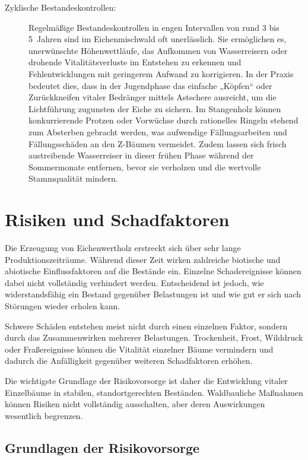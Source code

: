 \documentclass[twocolumn, bibliography=totoc, abstract=true]{scrartcl}
\begin{document}
\begin{description}
\item[Zyklische Bestandeskontrollen:] Regelmäßige Bestandeskontrollen in engen Intervallen von rund 3 bis 5~Jahren sind im Eichenmischwald oft unerlässlich. Sie ermöglichen es, unerwünschte Höhenwettläufe, das Aufkommen von Wasserreisern oder drohende Vitalitätsverluste im Entstehen zu erkennen und Fehlentwicklungen mit geringerem Aufwand zu korrigieren. In der Praxis bedeutet dies, dass in der Jugendphase das einfache „Köpfen“ oder Zurückkneifen vitaler Bedränger mittels Astschere ausreicht, um die Lichtführung zugunsten der Eiche zu sichern. Im Stangenholz können konkurrierende Protzen oder Vorwüchse durch rationelles Ringeln stehend zum Absterben gebracht werden, was aufwendige Fällungsarbeiten und Fällungsschäden an den Z-Bäumen vermeidet. Zudem lassen sich frisch austreibende Wasserreiser in dieser frühen Phase während der Sommermonate entfernen, bevor sie verholzen und die wertvolle Stammqualität mindern.
\end{description}


\section{Risiken und Schadfaktoren}

Die Erzeugung von Eichenwertholz erstreckt sich über sehr lange Produktionszeiträume. Während dieser Zeit wirken zahlreiche biotische und abiotische Einflussfaktoren auf die Bestände ein. Einzelne Schadereignisse können dabei nicht vollständig verhindert werden. Entscheidend ist jedoch, wie widerstandsfähig ein Bestand gegenüber Belastungen ist und wie gut er sich nach Störungen wieder erholen kann.

Schwere Schäden entstehen meist nicht durch einen einzelnen Faktor, sondern durch das Zusammenwirken mehrerer Belastungen. Trockenheit, Frost, Wilddruck oder Fraßereignisse können die Vitalität einzelner Bäume vermindern und dadurch die Anfälligkeit gegenüber weiteren Schadfaktoren erhöhen.

Die wichtigste Grundlage der Risikovorsorge ist daher die Entwicklung vitaler Einzelbäume in stabilen, standortgerechten Beständen. Waldbauliche Maßnahmen können Risiken nicht vollständig ausschalten, aber deren Auswirkungen wesentlich begrenzen.

\subsection{Grundlagen der Risikovorsorge}
\end{document}
